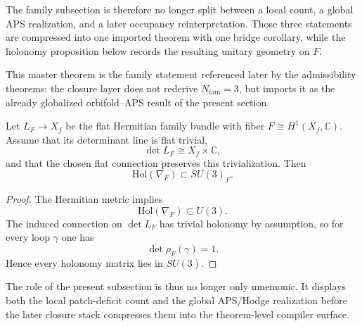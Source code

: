 The family subsection is therefore no longer split between a local count, a global APS realization, and a later occupancy reinterpretation. Those three statements are compressed into one imported theorem with one bridge corollary, while the holonomy proposition below records the resulting unitary geometry on $F$.

This master theorem is the family statement referenced later by the admissibility theorems: the closure layer does not rederive $N_{\mathrm{fam}}=3$, but imports it as the already globalized orbifold--APS result of the present section.

\begin{proposition}
\label{prop:family-holonomy-su3}
Let $L_F\to X_f$ be the flat Hermitian family bundle with fiber
$F\cong H^1(X_f,\mathbb C)$. Assume that its determinant line is flat trivial,
\[
\det L_F \cong X_f\times \mathbb C,
\]
and that the chosen flat connection preserves this trivialization. Then
\[
\mathrm{Hol}(\nabla_F)\subset SU(3)_F.
\]
\end{proposition}

\begin{proof}
The Hermitian metric implies
\[
\mathrm{Hol}(\nabla_F)\subset U(3).
\]
The induced connection on $\det L_F$ has trivial holonomy by assumption, so for
every loop $\gamma$ one has
\[
\det \rho_F(\gamma)=1.
\]
Hence every holonomy matrix lies in $SU(3)$.
\end{proof}

The role of the present subsection is thus no longer only mnemonic. It displays both the local patch-deficit count and the global APS/Hodge realization before the later closure stack compresses them into the theorem-level compiler surface.

